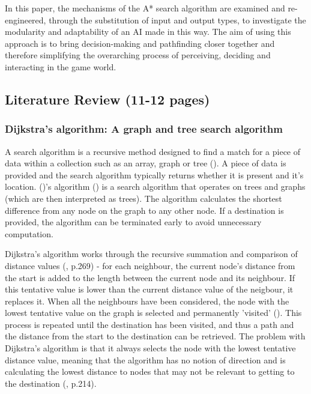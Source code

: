 \documentclass[11pt, a4paper]{article}
\begin{document}
In this paper, the mechanisms of the A* search algorithm are examined and re-engineered, through the substitution of input and output types, to investigate the modularity and adaptability of an AI made in this way. The aim of using this approach is to bring decision-making and pathfinding closer together and therefore simplifying the overarching process of perceiving, deciding and interacting in the game world.

\subsection{Literature Review (11-12 pages)}

\subsubsection{Dijkstra's algorithm: A graph and tree search algorithm}

A search algorithm is a recursive method designed to find a match for a piece of data within a collection such as an array, graph or tree (\cite{friedman1976algorithm}). A piece of data is provided and the search algorithm typically returns whether it is present and it's location. (\citeauthor{dijkstra1959note})'s algorithm (\citeyear{dijkstra1959note}) is a search algorithm that operates on trees and graphs (which are then interpreted as trees). The algorithm calculates the shortest difference from any node on the graph to any other node. If a destination is provided, the algorithm can be terminated early to avoid unnecessary computation. 

Dijkstra's algorithm works through the recursive summation and comparison of distance values (\cite{dijkstra1959note}, p.269) - for each neighbour, the current node's distance from the start is added to the length between the current node and its neighbour. If this tentative value is lower than the current distance value of the neigbour, it replaces it. When all the neighbours have been considered, the node with the lowest tentative value on the graph is selected and permanently 'visited' (\cite{dijkstra1959note}). This process is repeated until the destination has been visited, and thus a path and the distance from the start to the destination can be retrieved. The problem with Dijkstra's algorithm is that it always selects the node with the lowest tentative distance value, meaning that the algorithm has no notion of direction and is calculating the lowest distance to nodes that may not be relevant to getting to the destination (\cite{millington2019ai}, p.214).
\end{document}
